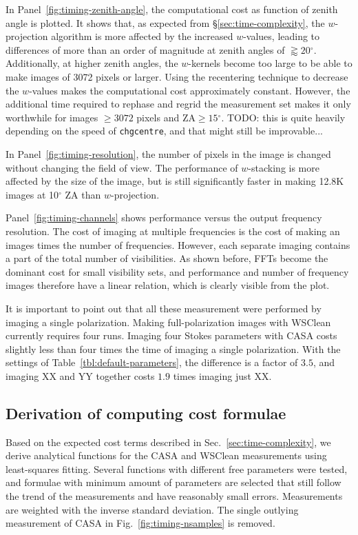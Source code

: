 \documentclass[useAMS,usenatbib]{mn2e}
\newcommand{\degree}{\ensuremath{^{\circ}}\xspace}
\begin{document}
In Panel~\ref{fig:timing-zenith-angle}, the computational cost as function of zenith angle is plotted. It shows that, as expected from \S\ref{sec:time-complexity}, the $w$-projection algorithm is more affected by the increased $w$-values, leading to differences of more than an order of magnitude at zenith angles of $\gtrapprox 20$\degree. Additionally, at higher zenith angles, the $w$-kernels become too large to be able to make images of 3072 pixels or larger. Using the recentering technique to decrease the $w$-values makes the computational cost approximately constant. However, the additional time required to rephase and regrid the measurement set makes it only worthwhile for images $\ge3072$ pixels and $\textrm{ZA}\ge15\degree$. TODO: this is quite heavily depending on the speed of \texttt{chgcentre}, and that might still be improvable...

In Panel~\ref{fig:timing-resolution}, the number of pixels in the image is changed without changing the field of view. The performance of $w$-stacking is more affected by the size of the image, but is still significantly faster in making 12.8K images at 10\degree ZA than $w$-projection. 

Panel~\ref{fig:timing-channels} shows performance versus the output frequency resolution. The cost of imaging at multiple frequencies is the cost of making an images times the number of frequencies. However, each separate imaging contains a part of the total number of visibilities. As shown before, FFTs become the dominant cost for small visibility sets, and performance and number of frequency images therefore have a linear relation, which is clearly visible from the plot.

It is important to point out that all these measurement were performed by imaging a single polarization. Making full-polarization images with WSClean currently requires four runs. Imaging four Stokes parameters with CASA costs slightly less than four times the time of imaging a single polarization. With the settings of Table~\ref{tbl:default-parameters}, the difference is a factor of $3.5$, and imaging XX and YY together costs $1.9$ times imaging just XX.

\subsection{Derivation of computing cost formulae}
Based on the expected cost terms described in Sec.~\ref{sec:time-complexity}, we derive analytical functions for the CASA and WSClean measurements using least-squares fitting. Several functions with different free parameters were tested, and formulae with minimum amount of parameters are selected that still follow the trend of the measurements and have reasonably small errors. Measurements are weighted with the inverse standard deviation. The single outlying measurement of CASA in Fig.~\ref{fig:timing-nsamples} is removed.
\end{document}
